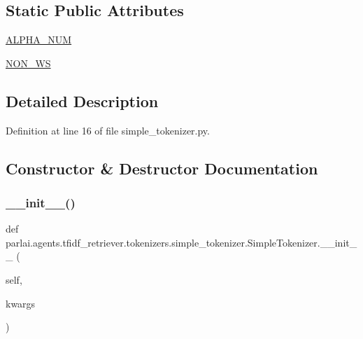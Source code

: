 \subsection*{Static Public Attributes}
\begin{DoxyCompactItemize}
\item 
\hyperlink{classparlai_1_1agents_1_1tfidf__retriever_1_1tokenizers_1_1simple__tokenizer_1_1SimpleTokenizer_aa6fcedf1435823fe5d79b8c73e769158}{A\+L\+P\+H\+A\+\_\+\+N\+UM}
\item 
\hyperlink{classparlai_1_1agents_1_1tfidf__retriever_1_1tokenizers_1_1simple__tokenizer_1_1SimpleTokenizer_a1b1a131ce26f695a109c07a04f857ab5}{N\+O\+N\+\_\+\+WS}
\end{DoxyCompactItemize}


\subsection{Detailed Description}


Definition at line 16 of file simple\+\_\+tokenizer.\+py.



\subsection{Constructor \& Destructor Documentation}
\mbox{\label{classparlai_1_1agents_1_1tfidf__retriever_1_1tokenizers_1_1simple__tokenizer_1_1SimpleTokenizer_a6a038fd66269e0a8e76e62260b13f4d9}} 
\subsubsection{\texorpdfstring{\+\_\+\+\_\+init\+\_\+\+\_\+()}{\_\_init\_\_()}}
{\footnotesize\ttfamily def parlai.\+agents.\+tfidf\+\_\+retriever.\+tokenizers.\+simple\+\_\+tokenizer.\+Simple\+Tokenizer.\+\_\+\+\_\+init\+\_\+\+\_\+ (\begin{DoxyParamCaption}\item[{}]{self,  }\item[{}]{kwargs }\end{DoxyParamCaption})}

